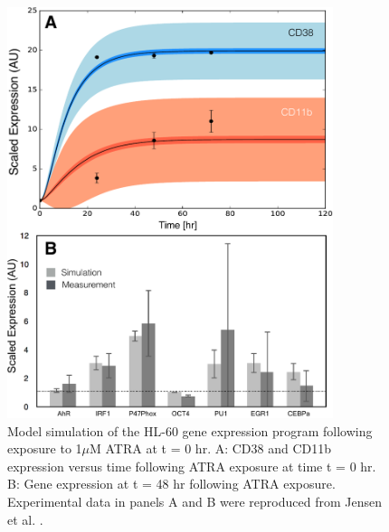 \documentclass[12pt]{article}
\begin{document}
\begin{figure}[!t]\centering
\includegraphics[width=0.85\textwidth]{./figs/Fig-5-GRN-Simulations.pdf}
\caption{Model simulation of the HL-60 gene expression program following exposure to 1$\mu$M ATRA at t = 0 hr.
A: CD38 and CD11b expression versus time following ATRA exposure at time t = 0 hr.
B: Gene expression at t = 48 hr following ATRA exposure.
Experimental data in panels A and B were reproduced from Jensen et al. \cite{Jensen:2015aa}.}\label{fig:model-grn-simulations}
\end{figure}

\clearpage

\renewcommand\thefigure{S\arabic{figure}}
\renewcommand\thetable{T\arabic{table}}
\renewcommand\thepage{S-\arabic{page}}
\renewcommand\theequation{S\arabic{equation}}

\setcounter{equation}{0}
\setcounter{table}{0}
\setcounter{figure}{0}
\setcounter{page}{1}
\end{document}
